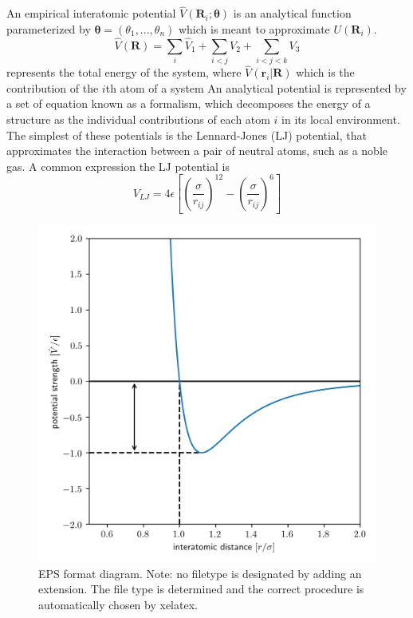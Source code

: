 An empirical interatomic potential $\hat{V}(\bm{R}_i;\bm{\theta})$ is an analytical function parameterized by $\bm{\theta}=(\theta_1,...,\theta_n)$ which is meant to approximate $U(\bm{R}_i)$.
\begin{equation}
	\hat{V}(\bm{R})=\sum_i \hat{V}_1 + \sum_{i<j} V_2 + \sum_{i<j<k} V_3
\end{equation}
represents the total energy of the system, where $\hat{V}(\bm{r}_i \vert \bm{R})$ which is the contribution of the $i$th atom of  a system
An analytical potential is represented by a set of equation known as a formalism, which decomposes the energy of a structure as the individual contributions of each atom $i$ in its local environment.
The simplest of these potentials is the Lennard-Jones (LJ) potential\cite{lennardjones1924_lj_pot}, that approximates the interaction between a pair of neutral atoms, such as a noble gas.
A common expression the LJ potential is
\begin{equation}
  V_{LJ} = 4 \epsilon
    \left[
	\left(\frac{\sigma}{r_{ij}}\right)^{12}
	- \left(\frac{\sigma}{r_{ij}}\right)^{6}
    \right]
\end{equation}


\begin{figure}[htbp]
  \centering
    \includegraphics[width=5in]{chapter3/lj}
    \caption[EPS format diagram. Note: no filetype is designated by adding an extension.]{EPS format diagram. Note: no filetype is designated by adding an extension. The file type is determined and the correct procedure is automatically chosen by xelatex.}
\end{figure}

